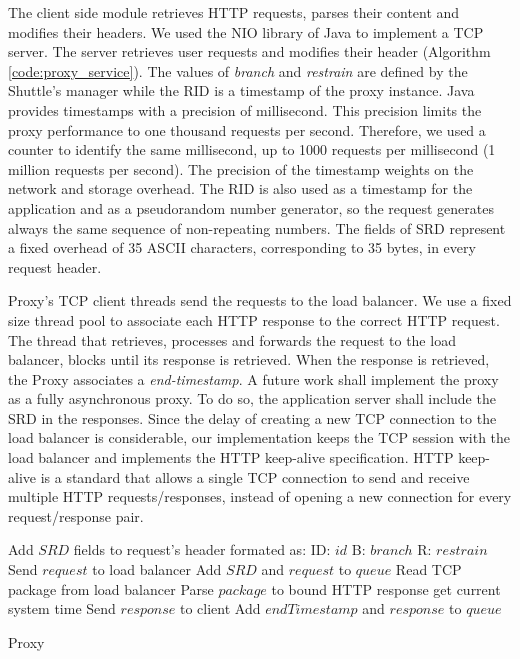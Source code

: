 The client side module retrieves \ac{HTTP} requests, parses their content and modifies their headers. We used the \ac{NIO} library of Java to implement a TCP server. The server retrieves user requests and modifies their header (Algorithm \ref{code:proxy_service}). The values of \emph{branch} and \emph{restrain} are defined by the Shuttle's manager while the \ac{RID} is a timestamp of the proxy instance. Java provides timestamps with a precision of millisecond. This precision limits the proxy performance to one thousand requests per second. Therefore, we used a counter to identify the same millisecond, up to 1000 requests per millisecond (1 million requests per second). The precision of the timestamp weights on the network and storage overhead. The \ac{RID} is also used as a timestamp for the application and as a pseudorandom number generator, so the request generates always the same sequence of non-repeating numbers. The fields of \acf{SRD} represent a fixed overhead of 35 ASCII characters, corresponding to 35 bytes, in every request header.

Proxy's TCP client threads send the requests to the load balancer. We use a fixed size thread pool to associate each \ac{HTTP} response to the correct \ac{HTTP} request. The thread that retrieves, processes and forwards the request to the load balancer, blocks until its response is retrieved. When the response is retrieved, the Proxy associates a \emph{end-timestamp}. A future work shall implement the proxy as a fully asynchronous proxy. To do so, the application server shall include the \ac{SRD} in the responses. Since the delay of creating a new TCP connection to the load balancer is considerable, our implementation keeps the TCP session with the load balancer and implements the \ac{HTTP} keep-alive specification. \ac{HTTP} keep-alive is a standard that allows a single TCP connection to send and receive multiple \ac{HTTP} requests/responses, instead of opening a new connection for every request/response pair. 

\begin{algorithm}
	\DontPrintSemicolon{}
		\;
		\BlankLine 
		\;
		\;
		\; 
		Add $SRD$ fields to request's header formated as: \newline ID: $id$ \newline B: $branch$ \newline R: $restrain$\;
		Send $request$ to load balancer\;
		Add $SRD$ and $request$ to $queue$\;
		 {Read TCP package from load balancer}\;
		 {Parse $package$ to bound \ac{HTTP} response}\;
		 {get current system time}\;
		Send $response$ to client\;
		Add $endTimestamp$ and $response$ to $queue$\;
  	\caption{Proxy}
	\label{code:proxy_service}
\end{algorithm}



